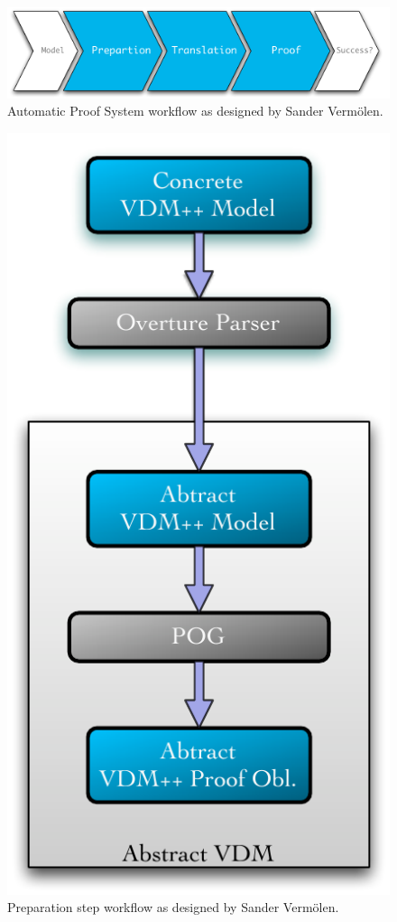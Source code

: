 \documentclass[]{article}
\begin{document}
\begin{figure}
  \begin{center}
    \includegraphics[width=\textwidth]{images/pic_arch.pdf}
    \caption[APS workflow]{Automatic Proof System workflow as designed by Sander Verm\"olen.}
    \label{fig:sander_arch}
  \end{center}
\end{figure}

\begin{figure}
  \begin{center}
  \includegraphics[height=.5\textheight]{images/pic_preparation.pdf}
  \caption[Preparation workflow]{Preparation step workflow as designed by Sander Verm\"olen.}
  \label{fig:arch_preparation}
  \end{center}
\end{figure}
\end{document}
